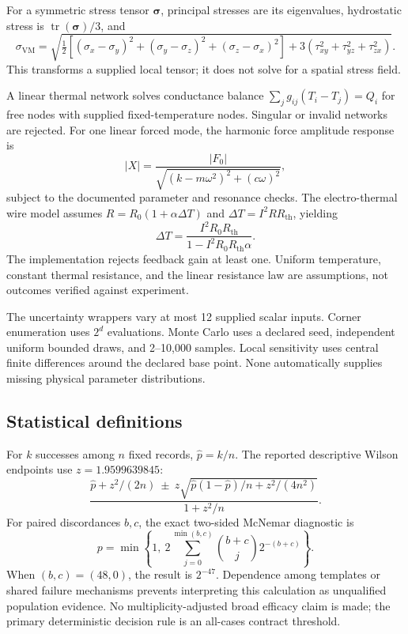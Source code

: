 \documentclass[10pt]{article}
\begin{document}
For a symmetric stress tensor \(\boldsymbol\sigma\), principal stresses are
its eigenvalues, hydrostatic stress is
\(\operatorname{tr}(\boldsymbol\sigma)/3\), and
\begin{equation}
\sigma_{\mathrm{VM}}=
\sqrt{\tfrac12[(\sigma_x-\sigma_y)^2+(\sigma_y-\sigma_z)^2+
(\sigma_z-\sigma_x)^2]+3(\tau_{xy}^2+\tau_{yz}^2+\tau_{zx}^2)}.
\end{equation}
This transforms a supplied local tensor; it does not solve for a spatial
stress field.

A linear thermal network solves conductance balance
\(\sum_j g_{ij}(T_i-T_j)=Q_i\) for free nodes with supplied fixed-temperature
nodes. Singular or invalid networks are rejected. For one linear forced mode,
the harmonic force amplitude response is
\begin{equation}
|X|=\frac{|F_0|}{\sqrt{(k-m\omega^2)^2+(c\omega)^2}},
\end{equation}
subject to the documented parameter and resonance checks. The electro-thermal
wire model assumes \(R=R_0(1+\alpha\Delta T)\) and
\(\Delta T=I^2R R_{\mathrm{th}}\), yielding
\begin{equation}
\Delta T=\frac{I^2R_0R_{\mathrm{th}}}
 {1-I^2R_0R_{\mathrm{th}}\alpha}.
\end{equation}
The implementation rejects feedback gain at least one. Uniform temperature,
constant thermal resistance, and the linear resistance law are assumptions,
not outcomes verified against experiment.

The uncertainty wrappers vary at most 12 supplied scalar inputs. Corner
enumeration uses \(2^d\) evaluations. Monte Carlo uses a declared seed,
independent uniform bounded draws, and 2--10,000 samples. Local sensitivity
uses central finite differences around the declared base point. None
automatically supplies missing physical parameter distributions.

\subsection{Statistical definitions}

For \(k\) successes among \(n\) fixed records, \(\hat p=k/n\). The reported
descriptive Wilson endpoints use \(z=1.9599639845\):
\begin{equation}
\frac{\hat p+z^2/(2n)\ \pm\
 z\sqrt{\hat p(1-\hat p)/n+z^2/(4n^2)}}{1+z^2/n}.
\end{equation}
For paired discordances \(b,c\), the exact two-sided McNemar diagnostic is
\begin{equation}
p=\min\left\{1,\ 2\sum_{j=0}^{\min(b,c)}
 \binom{b+c}{j}2^{-(b+c)}\right\}.
\end{equation}
When \((b,c)=(48,0)\), the result is \(2^{-47}\). Dependence among templates
or shared failure mechanisms prevents interpreting this calculation as
unqualified population evidence. No multiplicity-adjusted broad efficacy
claim is made; the primary deterministic decision rule is an all-cases
contract threshold.
\end{document}
